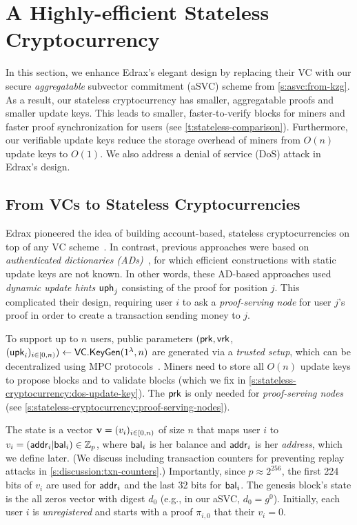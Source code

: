 \section{A Highly-efficient Stateless Cryptocurrency}
\label{s:stateless-cryptocurrency}

In this section, we enhance Edrax's elegant design by replacing their VC with our secure \textit{aggregatable} subvector commitment (aSVC) scheme from \cref{s:asvc:from-kzg}.
As a result, our stateless cryptocurrency has smaller, aggregatable proofs and smaller update keys.
This leads to smaller, faster-to-verify blocks for miners and faster proof synchronization for users (see \cref{t:stateless-comparison}).
Furthermore, our verifiable update keys reduce the storage overhead of miners from $O(n)$ update keys to $O(1)$.
We also address a denial of service (DoS) attack in Edrax's design.

\subsection{From VCs to Stateless Cryptocurrencies}
\label{s:stateless-cryptocurrency:edrax}
Edrax pioneered the idea of building account-based, stateless cryptocurrencies on top of any VC scheme~\cite{CPZ18}.
In contrast, previous approaches were based on \textit{authenticated dictionaries (ADs)}~\cite{RMCI17,Buterin17}, for which efficient constructions with static update keys are not known.
In other words, these AD-based approaches used \textit{dynamic update hints} $\mathsf{uph}_j$ consisting of the proof for position $j$.
This complicated their design, requiring user $i$ to ask a \textit{proof-serving node} for user $j$'s proof in order to create a transaction sending money to $j$.

To support up to $n$ users, public parameters $(\mathsf{prk},\mathsf{vrk}$, \ifCameraReady\linebreak[4]\fi$(\mathsf{upk}_i)_{i\in[0,n)})\leftarrow \mathsf{VC}.\mathsf{KeyGen}(1^{\lambda}, n)$ are generated via a \textit{trusted setup}, which can be decentralized using MPC protocols~\cite{BGM17}.
Miners need to store all $O(n)$ update keys to propose blocks and to validate blocks (which we fix in \cref{s:stateless-cryptocurrency:dos-update-key}).
The $\mathsf{prk}$ is only needed for \textit{proof-serving nodes} (see \cref{s:stateless-cryptocurrency:proof-serving-nodes}).

The state is a vector $\bm{\mathrm{v}}=(v_i)_{i\in[0,n)}$ of size $n$ that maps user $i$ to $v_i=(\mathsf{addr}_i|\mathsf{bal}_i)\in \mathbb{Z}_p$, where $\mathsf{bal}_i$ is her balance and $\mathsf{addr}_i$ is her \textit{address}, which we define later.
(We discuss including transaction counters for preventing replay attacks in \cref{s:discussion:txn-counters}.)
Importantly, since $p \approx 2^{256}$, the first 224 bits of $v_i$ are used for $\mathsf{addr}_i$ and the last 32 bits for $\mathsf{bal}_i$.
The genesis block's state is the all zeros vector with digest $d_0$
(e.g., in our aSVC, $d_0=g^0$).
Initially, each user $i$ is \textit{unregistered} and starts with a proof $\pi_{i,0}$ that their $v_i = 0$.

